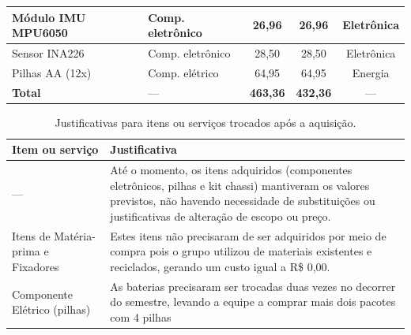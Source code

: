 \begin{landscape}
\begin{table}[htpb]
\begin{center}
\begin{tabular}{|p{7cm}|p{3.5cm}|c|c|c|}
Módulo IMU MPU6050                  & Comp. eletrônico & 26,96  & 26,96  & Eletrônica \\ \hline
Sensor INA226                       & Comp. eletrônico & 28,50  & 28,50  & Eletrônica \\ \hline
Pilhas AA (12x)                      & Comp. elétrico   & 64,95  & 64,95  & Energia    \\ \hline
\textbf{Total}                      & ---           & \textbf{463,36} & \textbf{432,36} & --- \\ \hline
\end{tabular}
\end{center}
\end{table}

\begin{table}[htpb]
\begin{center}
\caption{Justificativas para itens ou serviços trocados após a aquisição.}
\begin{tabular}{|p{5cm}|p{16cm}|} \hline
\textbf{Item ou serviço} & \textbf{Justificativa}  \\ \hline
    --- &
    Até o momento, os itens adquiridos (componentes eletrônicos, pilhas e kit chassi) mantiveram os valores previstos, não havendo necessidade de substituições ou justificativas de alteração de escopo ou preço. \\ \hline
    Itens de Matéria-prima e Fixadores & Estes itens não precisaram de ser adquiridos por meio de compra pois o grupo utilizou de materiais existentes e reciclados, gerando um custo igual a R\$ 0,00. \\ \hline
    Componente Elétrico (pilhas) & As baterias precisaram ser trocadas duas vezes no decorrer do semestre, levando a equipe a comprar mais dois pacotes com 4 pilhas \\ \hline
\end{tabular}
\end{center}
\end{table}

\end{landscape}